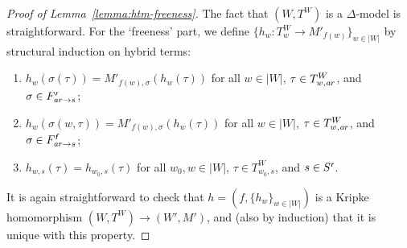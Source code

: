 \documentclass[a4paper,UKenglish,cleveref,autoref]{lipics-v2019}
\begin{document}
\begin{proof}[Proof of Lemma~\ref{lemma:htm-freeness}]
  The fact that \((W, T^{W})\) is a \(\Delta\)-model is straightforward.
  For the `freeness' part, we define \(\{ h_{w} \colon T^{W}_{w} \to M'_{f(w)} \}_{w \in |W|}\) by structural induction on hybrid terms:
  \begin{enumerate}
  \item \(h_{w}(\sigma(\tau)) = M'_{f(w),\sigma}(h_{w}(\tau))\) for all \(w \in |W|\), \(\tau \in T^{W}_{w,\mathit{a\mkern -1mu r}}\), and \(\sigma \in F^{\text{\normalfont\sffamily\itshape r}}_{\mathit{a\mkern -1mu r} \to s}\);

  \item \(h_{w}(\sigma(w, \tau)) = M'_{f(w),\sigma}(h_{w}(\tau))\) for all \(w \in |W|\), \(\tau \in T^{W}_{w,\mathit{a\mkern -1mu r}}\), and \(\sigma \in F^{\text{\normalfont\sffamily\itshape f}}_{\mathit{a\mkern -1mu r} \to s}\);

  \item \(h_{w, s}(\tau) = h_{w_{0}, s}(\tau)\) for all \(w_{0}, w \in |W|\), \(\tau \in T^{W}_{w_{0}, s}\), and \(s \in S^{\text{\normalfont\sffamily\itshape r}}\).

  \end{enumerate}
  It is again straightforward to check that \(h = (f, \{ h_{w} \}_{w \in |W|})\) is a Kripke homomorphism \((W, T^{W}) \to (W', M')\), and (also by induction) that it is unique with this property.
\end{proof}
\end{document}
